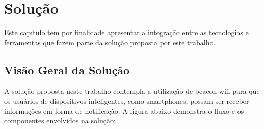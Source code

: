 \chapter{Solução}
\label{cap:solucao}

Este capítulo tem por finalidade apresentar a integração entre as tecnologias e ferramentas que fazem parte da solução proposta por este trabalho.

\section{Visão Geral da Solução}
\label{sec:visao-geral}

A solução proposta neste trabalho contempla a utilização de beacon wifi para que os usuários de dispositivos inteligentes, como smartphones, possam ser receber informações em forma de notificação. A figura abaixo demonstra o fluxo e os componentes envolvidos na solução: 

\begin{figure}[h!]
	\centering
\end{figure}

